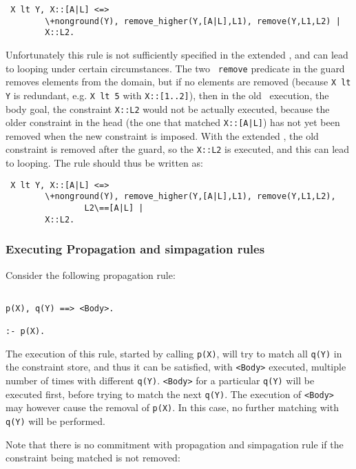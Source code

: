 \begin{verbatim}
 X lt Y, X::[A|L] <=> 
        \+nonground(Y), remove_higher(Y,[A|L],L1), remove(Y,L1,L2) |
        X::L2.
\end{verbatim}

Unfortunately this rule is not sufficiently specified in the extended
\chr, and can lead to looping under certain circumstances. The two {\tt
remove} predicate in the guard removes elements from the domain, but if no
elements are removed (because \verb+X lt Y+ is redundant, e.g. \verb+X lt 5+ with
\verb+X::[1..2]+), then in the old \chr\ execution, the body goal, the constraint
\verb+X::L2+ would not be actually executed, because the older constraint in
the head (the one that matched \verb+X::[A|L]+) has not yet been removed when
the new constraint is imposed. With the extended \chr, the old constraint
is removed after the guard, so the \verb+X::L2+ is executed, and this can
lead to looping. The rule should thus be written as:

\begin{verbatim}
 X lt Y, X::[A|L] <=> 
        \+nonground(Y), remove_higher(Y,[A|L],L1), remove(Y,L1,L2),
                L2\==[A|L] |
        X::L2.
\end{verbatim}

\subsubsection{Executing Propagation and simpagation rules}

Consider the following propagation rule:

\begin{verbatim}

p(X), q(Y) ==> <Body>.

:- p(X).
\end{verbatim}

The execution of this rule, started by calling \verb'p(X)', will try to match
all \verb'q(Y)' in the constraint store, and thus it can be satisfied,
with \verb'<Body>' executed,
multiple number of times with different \verb'q(Y)'. \verb'<Body>' for
a particular \verb'q(Y)' will be executed first, before trying to match
the next \verb'q(Y)'. The execution of \verb'<Body>' may however cause the 
removal of \verb'p(X)'. In this case, no further matching with \verb'q(Y)'
will be performed.

Note that there is no commitment with propagation and simpagation rule
if the constraint being matched is not removed:

